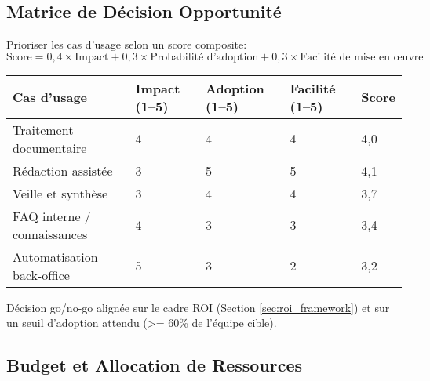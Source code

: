 \subsection{Matrice de Décision Opportunité}
Prioriser les cas d’usage selon un score composite:
\[
\text{Score} = 0{,}4 \times \text{Impact} + 0{,}3 \times \text{Probabilité d’adoption} + 0{,}3 \times \text{Facilité de mise en œuvre}
\]
\begin{longtable}{@{}p{6cm}p{2.2cm}p{2.6cm}p{2.4cm}p{2.4cm}@{}}
\toprule
\textbf{Cas d’usage} & \textbf{Impact (1–5)} & \textbf{Adoption (1–5)} & \textbf{Facilité (1–5)} & \textbf{Score} \\
\midrule
Traitement documentaire & 4 & 4 & 4 & 4{,}0 \\
Rédaction assistée & 3 & 5 & 5 & 4{,}1 \\
Veille et synthèse & 3 & 4 & 4 & 3{,}7 \\
FAQ interne / connaissances & 4 & 3 & 3 & 3{,}4 \\
Automatisation back-office & 5 & 3 & 2 & 3{,}2 \\
\bottomrule
\end{longtable}
Décision go/no-go alignée sur le cadre ROI (Section \ref{sec:roi_framework}) et sur un seuil d’adoption attendu (\textgreater{}= 60\% de l’équipe cible).

\subsection{Budget et Allocation de Ressources}

